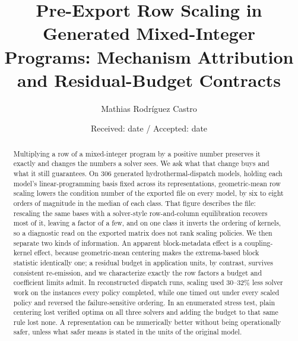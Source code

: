 \documentclass[smallextended,envcountsect,envcountsame]{svjour3}
\begin{document}
\title{Pre-Export Row Scaling in Generated Mixed-Integer Programs: Mechanism Attribution and
Residual-Budget Contracts}
\author{Mathias Rodr\'iguez Castro}
\date{Received: date / Accepted: date}
\maketitle

\begin{abstract}
Multiplying a row of a mixed-integer program by a positive number preserves it exactly and
changes the numbers a solver sees. We ask what that change buys and what it still guarantees.
On 306 generated hydrothermal-dispatch models, holding each model's linear-programming basis fixed
across its representations, geometric-mean row scaling lowers the condition number of the exported file on
every model, by six to eight orders of magnitude in the median of each class. That figure
describes the file: rescaling the same bases with a solver-style row-and-column equilibration
recovers most of it, leaving a factor of a few, and on one class it inverts the ordering of
kernels, so a diagnostic read on
the exported matrix does not rank scaling policies. We then separate two kinds of
information. An apparent block-metadata effect is a coupling-kernel effect, because
geometric-mean centering makes the extrema-based block statistic identically one; a residual
budget in application units, by contrast, survives consistent re-emission, and we characterize
exactly the row factors a budget and coefficient limits admit. In reconstructed dispatch runs, scaling used
30--32\% less solver work on the instances every policy completed, while one timed out under
every scaled policy and reversed the failure-sensitive ordering. In an enumerated stress test,
plain centering lost verified optima on all three solvers and adding the budget to that same
rule lost none. A representation can be numerically better without
being operationally safer, unless what safer means is stated in the units of the original
model.
\end{abstract}
\end{document}
